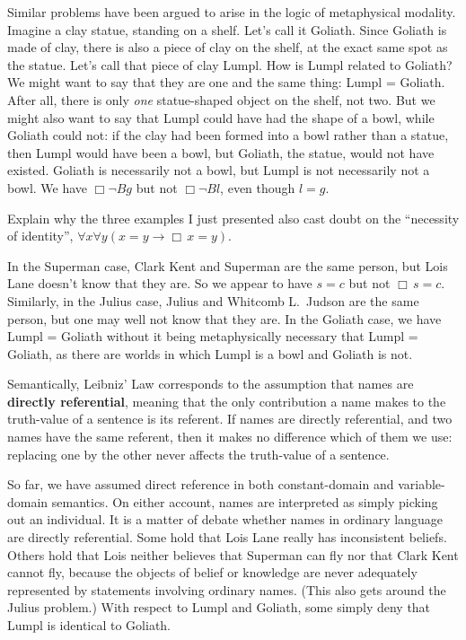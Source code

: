Similar problems have been argued to arise in the logic of metaphysical
modality. Imagine a clay statue, standing on a shelf. Let's call it
Goliath. Since Goliath is made of clay, there is also a piece of clay on the
shelf, at the exact same spot as the statue. Let's call that piece of clay
Lumpl. How is Lumpl related to Goliath? We might want to say that they are one
and the same thing: Lumpl = Goliath. After all, there is only \emph{one}
statue-shaped object on the shelf, not two. But we might also want to say that
Lumpl could have had the shape of a bowl, while Goliath could not: if the clay
had been formed into a bowl rather than a statue, then Lumpl would have been a
bowl, but Goliath, the statue, would not have existed. Goliath is necessarily
not a bowl, but Lumpl is not necessarily not a bowl. We have $\Box \neg Bg$ but
not $\Box \neg Bl$, even though $l\!=\!g$.

\begin{exercise}
  Explain why the three examples I just presented also cast doubt on the
  ``necessity of identity'', $\forall x\forall y(x\!=\!y \to \Box\, x\!=\!y)$.
\end{exercise}
\begin{solution}
  In the Superman case, Clark Kent and Superman are the same person, but Lois
  Lane doesn't know that they are. So we appear to have $s\!=\!c$ but not
  $\Box\, s\!=\!c$. Similarly, in the Julius case, Julius and Whitcomb L.\ Judson
  are the same person, but one may well not know that they are. In the Goliath
  case, we have Lumpl = Goliath without it being metaphysically necessary that
  Lumpl = Goliath, as there are worlds in which Lumpl is a bowl and Goliath is
  not.
\end{solution}

Semantically, Leibniz' Law corresponds to the assumption that names are
\textbf{directly referential}, meaning that the only contribution a name makes
to the truth-value of a sentence is its referent. If names are directly
referential, and two names have the same referent, then it makes no difference
which of them we use: replacing one by the other never affects the truth-value
of a sentence.

So far, we have assumed direct reference in both constant-domain and
variable-domain semantics. On either account, names are interpreted as simply
picking out an individual. It is a matter of debate whether names in ordinary
language are directly referential. Some hold that Lois Lane really has
inconsistent beliefs. Others hold that Lois neither believes that Superman can
fly nor that Clark Kent cannot fly, because the objects of belief or knowledge
are never adequately represented by statements involving ordinary names. (This
also gets around the Julius problem.) With respect to Lumpl and Goliath, some
simply deny that Lumpl is identical to Goliath.

